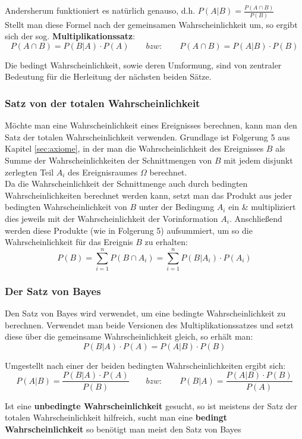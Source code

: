 \documentclass[a4paper]{article}
\newcommand\dangersign[1][2ex]{%
  \renewcommand\stacktype{L}%
  \scaleto{\stackon[1.3pt]{\color{red}$\triangle$}{\tiny !}}{#1}%
}
\begin{document}
\noindent \dangersign[3ex] Andersherum funktioniert es natürlich genauso, d.h. $P(A|B) = \frac{P(A \cap B)}{P(B)}$\\

\noindent Stellt man diese Formel nach der gemeinsamen Wahrscheinlichkeit um, so ergibt sich der sog. \textbf{Multiplikationssatz}:
$$P(A \cap B) = P(B|A) \cdot P(A) \qquad bzw: \qquad P(A \cap B) = P(A|B) \cdot P(B)$$

\noindent Die bedingt Wahrscheinlichkeit, sowie deren Umformung, sind von zentraler Bedeutung für die Herleitung der nächsten beiden Sätze.

\subsubsection{Satz von der totalen Wahrscheinlichkeit}\label{sec:tot-wkeit}
Möchte man eine Wahrscheinlichkeit eines Ereignisses berechnen, kann man den Satz der totalen Wahrscheinlichkeit verwenden. Grundlage ist Folgerung 5 aus Kapitel \ref{sec:axiome}, in der man die Wahrscheinlichkeit des Ereignisses $B$ als Summe der Wahrscheinlichkeiten der Schnittmengen von $B$ mit jedem disjunkt zerlegten Teil $A_i$ des Ereignisraumes $\Omega$ berechnet.\\
Da die Wahrscheinlichkeit der Schnittmenge auch durch bedingten Wahrscheinlichkeiten berechnet werden kann, setzt man das Produkt aus jeder bedingten Wahrscheinlichkeit von $B$ unter der Bedingung $A_i$ ein \& multipliziert dies jeweils mit der Wahrscheinlichkeit der Vorinformation $A_i$. Anschließend werden diese Produkte (wie in Folgerung 5) aufsummiert, um so die Wahrscheinlichkeit für das Ereignis $B$ zu erhalten:
$$P(B) = \sum_{i=1}^n P(B \cap A_i) = \sum_{i=1}^n P(B|A_i) \cdot P(A_i)$$

\subsubsection{Der Satz von Bayes}\label{sec:bayes}
Den Satz von Bayes wird verwendet, um eine bedingte Wahrscheinlichkeit zu berechnen. Verwendet man beide Versionen des Multiplikationssatzes und setzt diese über die gemeinsame Wahrscheinlichkeit gleich, so erhält man: 
$$P(B|A) \cdot P(A) = P(A|B) \cdot P(B)$$

\noindent Umgestellt nach einer der beiden bedingten Wahrscheinlichkeiten ergibt sich:
$$ P(A|B) = \frac{P(B|A)\cdot P(A)}{P(B)} \qquad bzw: \qquad P(B|A) = \frac{P(A|B)\cdot P(B)}{P(A)}$$

\noindent \dangersign[3ex] Ist eine \textbf{unbedingte Wahrscheinlichkeit} gesucht, so ist meistens der Satz der totalen Wahrscheinlichkeit hilfreich, sucht man eine \textbf{bedingt Wahrscheinlichkeit} so benötigt man meist den Satz von Bayes
\end{document}
